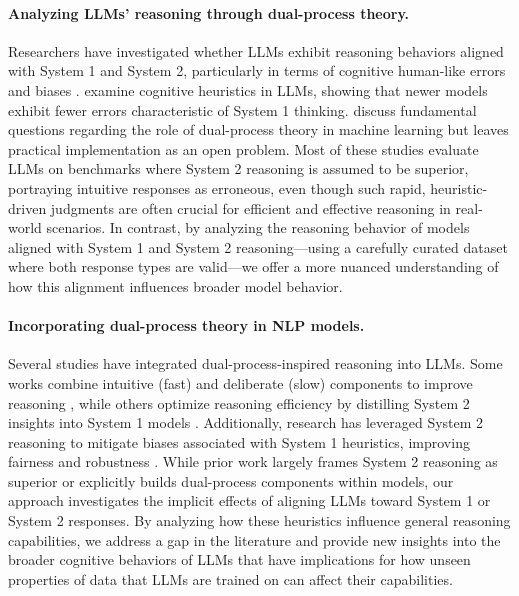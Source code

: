 \paragraph{Analyzing LLMs' reasoning through dual-process theory.} 
Researchers have investigated whether LLMs exhibit reasoning behaviors aligned with System 1 and System 2, particularly in terms of cognitive human-like errors and biases \citep{hagendorff2023human,booch2021thinking,pan2024dynathink,echterhoff2024cognitive,zeng2024mr}. \citet{hagendorff2023human} examine cognitive heuristics in LLMs, showing that newer models exhibit fewer errors characteristic of System 1 thinking. \citet{booch2021thinking} discuss fundamental questions regarding the role of dual-process theory in machine learning but leaves practical implementation as an open problem. Most of these studies evaluate LLMs on benchmarks where System 2 reasoning is assumed to be superior, portraying intuitive responses as erroneous, even though such rapid, heuristic-driven judgments are often crucial for efficient and effective reasoning in real-world scenarios. In contrast, by analyzing the reasoning behavior of models aligned with System 1 and System 2 reasoning—using a carefully curated dataset where both response types are valid—we offer a more nuanced understanding of how this alignment influences broader model behavior.

\paragraph{Incorporating dual-process theory in NLP models.} 
Several studies have integrated dual-process-inspired reasoning into LLMs. Some works combine intuitive (fast) and deliberate (slow) components to improve reasoning \citep{he-etal-2024-planning, liu2022neural, hua-zhang-2022-system, pan2024dynathink}, while others optimize reasoning efficiency by distilling System 2 insights into System 1 models \citep{yang2024llm2, deng2024cognidual, yu2024distilling}. Additionally, research has leveraged System 2 reasoning to mitigate biases associated with System 1 heuristics, improving fairness and robustness \citep{furniturewala2024thinking, kamruzzaman2024prompting, weston2023system}. While prior work largely frames System 2 reasoning as superior or explicitly builds dual-process components within models, our approach investigates the implicit effects of aligning LLMs toward System 1 or System 2 responses. By analyzing how these heuristics influence general reasoning capabilities, we address a gap in the literature and provide new insights into the broader cognitive behaviors of LLMs that have implications for how unseen properties of data that LLMs are trained on can affect their capabilities.